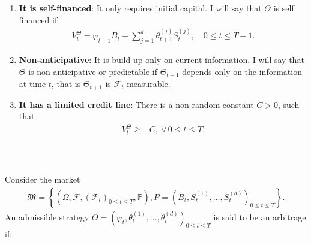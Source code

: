 \documentclass{beamer}
\numberwithin{equation}{section}
\begin{document}
\begin{frame}\frametitle{{\normalsize \secname} \\ {\large \subsecname}}
    \begin{enumerate}
        \item \textbf{It is self-financed}: It only requires initial capital.
        I will say that $\Theta$ is self financed if
        \begin{align}
            V_t^{\Theta} = \varphi_{t+1}B_t + \sum_{j=1}^d \theta_{t+1}^{(j)}S_t^{(j)}, \quad 0 \leq t \leq T-1. 
        \end{align}
        \item \textbf{Non-anticipative}: It is build up only on current information.
        I will say that $\Theta$ is non-anticipative or predictable if $\Theta_{t+1}$ depends only on the information at time $t$, that is $\Theta_{t+1}$ is $\mathscr{F}_t$-measurable.
        \item \textbf{It has a limited credit line}: There is a non-random constant $C > 0$, such that
        \begin{align}
            V_t^{\Theta} \geq -C, \ \forall \, 0 \leq t \leq T.
        \end{align}
    \end{enumerate}
\end{frame}

\begin{frame}\frametitle{{\normalsize \secname} \\ {\large \subsecname}}
    \begin{definition}[Arbitrage]
        Consider the market
        \begin{align}
            \mathfrak{M} =
            \left\{
                \left(
                    \Omega, 
                    \mathscr{F}, 
                    \left(
                        \mathscr{F}_t
                    \right)_{0 \leq t \leq T},
                    \mathbb{P}
                \right),
                P =
                \left(
                    B_t,
                    S_t^{(1)},
                    \ldots,
                    S_t^{(d)}
                \right)_{0 \leq t \leq T}
            \right\}.
        \end{align}
        An admissible strategy $\Theta = \left(\varphi_t, \theta_t^{(1)}, \ldots, \theta_t^{(d)}\right)_{0 \leq t \leq T}$ is said to be an arbitrage if:
    \end{definition}
\end{frame}
\end{document}
